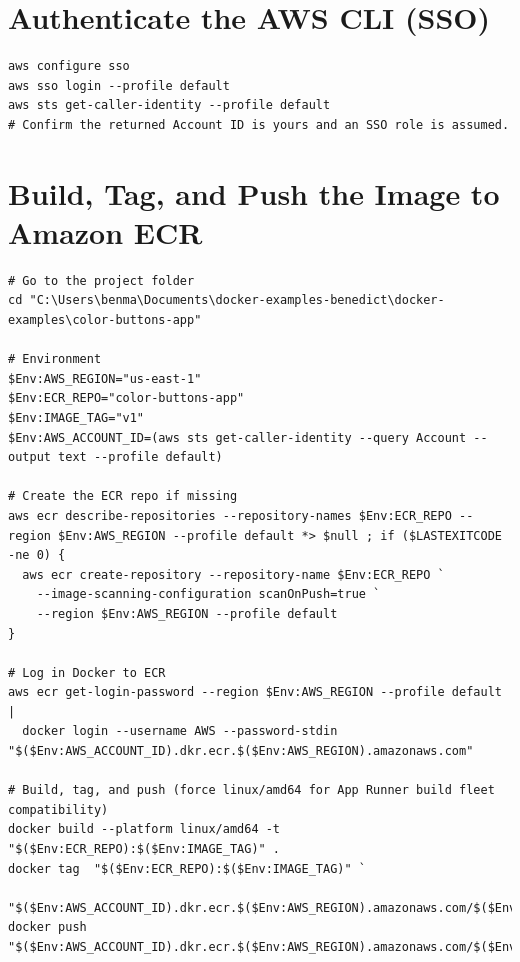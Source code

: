 \section*{Authenticate the AWS CLI (SSO)}
\begin{verbatim}
aws configure sso
aws sso login --profile default
aws sts get-caller-identity --profile default
# Confirm the returned Account ID is yours and an SSO role is assumed.
\end{verbatim}

\section*{Build, Tag, and Push the Image to Amazon ECR}
\vspace{-0.5\baselineskip}
\begin{verbatim}
# Go to the project folder
cd "C:\Users\benma\Documents\docker-examples-benedict\docker-examples\color-buttons-app"

# Environment
$Env:AWS_REGION="us-east-1"
$Env:ECR_REPO="color-buttons-app"
$Env:IMAGE_TAG="v1"
$Env:AWS_ACCOUNT_ID=(aws sts get-caller-identity --query Account --output text --profile default)

# Create the ECR repo if missing
aws ecr describe-repositories --repository-names $Env:ECR_REPO --region $Env:AWS_REGION --profile default *> $null ; if ($LASTEXITCODE -ne 0) {
  aws ecr create-repository --repository-name $Env:ECR_REPO `
    --image-scanning-configuration scanOnPush=true `
    --region $Env:AWS_REGION --profile default
}

# Log in Docker to ECR
aws ecr get-login-password --region $Env:AWS_REGION --profile default |
  docker login --username AWS --password-stdin "$($Env:AWS_ACCOUNT_ID).dkr.ecr.$($Env:AWS_REGION).amazonaws.com"

# Build, tag, and push (force linux/amd64 for App Runner build fleet compatibility)
docker build --platform linux/amd64 -t "$($Env:ECR_REPO):$($Env:IMAGE_TAG)" .
docker tag  "$($Env:ECR_REPO):$($Env:IMAGE_TAG)" `
            "$($Env:AWS_ACCOUNT_ID).dkr.ecr.$($Env:AWS_REGION).amazonaws.com/$($Env:ECR_REPO):$($Env:IMAGE_TAG)"
docker push "$($Env:AWS_ACCOUNT_ID).dkr.ecr.$($Env:AWS_REGION).amazonaws.com/$($Env:ECR_REPO):$($Env:IMAGE_TAG)"
\end{verbatim}

